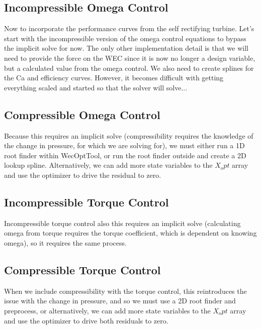 \documentclass[conf]{new-aiaa}
\begin{document}
\subsection{Incompressible Omega Control}

Now to incorporate the performance curves from the self rectifying turbine.  Let's start with the incompressible version of the omega control equations to bypass the implicit solve for now.  The only other implementation detail is that we will need to provide the force on the WEC since it is now no longer a design variable, but a calculated value from the omega control.  We also need to create splines for the Ca and efficiency curves. However, it becomes difficult with getting everything scaled and started so that the solver will solve...

\subsection{Compressible Omega Control}

Because this requires an implicit solve (compressibility requires the knowledge of the change in pressure, for which we are solving for), we must either run a 1D root finder within WecOptTool, or run the root finder outside and create a 2D lookup spline.  Alternatively, we can add more state variables to the $X_opt$ array and use the optimizer to drive the residual to zero.

\subsection{Incompressible Torque Control}

Incompressible torque control also this requires an implicit solve (calculating omega from torque requires the torque coefficient, which is dependent on knowing omega), so it requires the same process.

\subsection{Compressible Torque Control}

When we include compressibility with the torque control, this reintroduces the issue with the change in pressure, and so we must use a 2D root finder and preprocess, or alternatively, we can add more state variables to the $X_opt$ array and use the optimizer to drive both residuals to zero.




\end{document}
